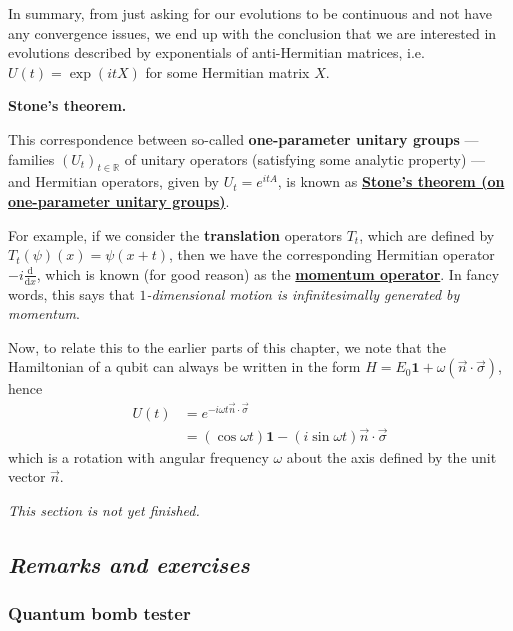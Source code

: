 \documentclass[fleqn,a4paper]{article}
\newenvironment{technical}[1]{\textbf{#1.}\par\vspace{.5\baselineskip}\everypar{\setlength{\parindent}{1.5em}}}{}
\newenvironment{todo}{\color{primary}\emph{This section is not yet finished.}}{}
\theoremstyle{definition}
\theoremstyle{definition}
\theoremstyle{definition}
\theoremstyle{definition}
\theoremstyle{remark}
\begin{document}
In summary, from just asking for our evolutions to be continuous and not have any convergence issues, we end up with the conclusion that we are interested in evolutions described by exponentials of anti-Hermitian matrices, i.e.~\(U(t)=\exp(itX)\) for some Hermitian matrix \(X\).

\begin{technical}{Stone's theorem}
This correspondence between so-called \textbf{one-parameter unitary groups} --- families \((U_t)_{t\in\mathbb{R}}\) of unitary operators (satisfying some analytic property) --- and Hermitian operators, given by \(U_t=e^{itA}\), is known as \href{https://en.wikipedia.org/wiki/Stone\%27s_theorem_on_one-parameter_unitary_groups}{\textbf{Stone's theorem (on one-parameter unitary groups)}}.

For example, if we consider the \textbf{translation} operators \(T_t\), which are defined by \(T_t(\psi)(x)=\psi(x+t)\), then we have the corresponding Hermitian operator \(-i\frac{\mathrm{d}}{\mathrm{d}x}\), which is known (for good reason) as the \href{https://en.wikipedia.org/wiki/Momentum_operator}{\textbf{momentum operator}}.
In fancy words, this says that \emph{\(1\)-dimensional motion is infinitesimally generated by momentum}.

\end{technical}

Now, to relate this to the earlier parts of this chapter, we note that the Hamiltonian of a qubit can always be written in the form \(H = E_0\mathbf{1}+\omega(\vec{n}\cdot\vec{\sigma})\), hence
\[
  \begin{aligned}
    U(t)
    &= e^{-i\omega t \vec n\cdot\vec\sigma}
  \\&= (\cos\omega t)\mathbf{1}- (i\sin\omega t)\vec{n}\cdot\vec{\sigma}
  \end{aligned}
\]
which is a rotation with angular frequency \(\omega\) about the axis defined by the unit vector \(\vec n\).

\begin{todo}

\end{todo}

\hypertarget{remarks-and-exercises-pauli-bloch}{%
\subsection{\texorpdfstring{\emph{Remarks and exercises}}{Remarks and exercises}}\label{remarks-and-exercises-pauli-bloch}}

\hypertarget{quantum-bomb-tester}{%
\subsubsection{Quantum bomb tester}\label{quantum-bomb-tester}}
\end{document}
